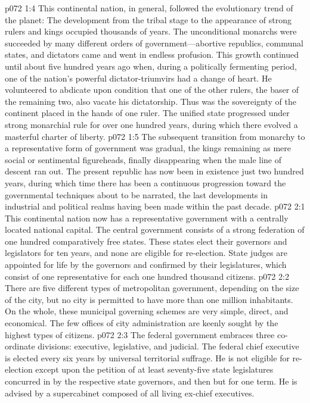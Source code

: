 \pc \vs p072 1:4 This continental nation, in general, followed the evolutionary trend of the planet: The development from the tribal stage to the appearance of strong rulers and kings occupied thousands of years. The unconditional monarchs were succeeded by many different orders of government---abortive republics, communal states, and dictators came and went in endless profusion. This growth continued until about five hundred years ago when, during a politically fermenting period, one of the nation’s powerful dictator\hyp{}triumvirs had a change of heart. He volunteered to abdicate upon condition that one of the other rulers, the baser of the remaining two, also vacate his dictatorship. Thus was the sovereignty of the continent placed in the hands of one ruler. The unified state progressed under strong monarchial rule for over one hundred years, during which there evolved a masterful charter of liberty.
\vs p072 1:5 The subsequent transition from monarchy to a representative form of government was gradual, the kings remaining as mere social or sentimental figureheads, finally disappearing when the male line of descent ran out. The present republic has now been in existence just two hundred years, during which time there has been a continuous progression toward the governmental techniques about to be narrated, the last developments in industrial and political realms having been made within the past decade.
\vs p072 2:1 This continental nation now has a representative government with a centrally located national capital. The central government consists of a strong federation of one hundred comparatively free states. These states elect their governors and legislators for ten years, and none are eligible for re\hyp{}election. State judges are appointed for life by the governors and confirmed by their legislatures, which consist of one representative for each one hundred thousand citizens.
\vs p072 2:2 There are five different types of metropolitan government, depending on the size of the city, but no city is permitted to have more than one million inhabitants. On the whole, these municipal governing schemes are very simple, direct, and economical. The few offices of city administration are keenly sought by the highest types of citizens.
\vs p072 2:3 The federal government embraces three co\hyp{}ordinate divisions: executive, legislative, and judicial. The federal chief executive is elected every six years by universal territorial suffrage. He is not eligible for re\hyp{}election except upon the petition of at least seventy\hyp{}five state legislatures concurred in by the respective state governors, and then but for one term. He is advised by a supercabinet composed of all living ex\hyp{}chief executives.
